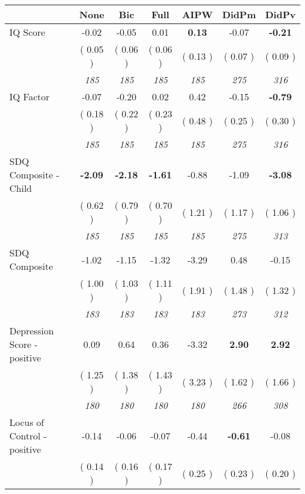 \begin{tabular}{l c c c c c c}
\toprule
 & None & Bic & Full & AIPW & DidPm & DidPv \\
\midrule
IQ Score &     -0.02 &     -0.05 &      0.01 & \textbf{     0.13} &     -0.07 & \textbf{     -0.21 } \\
& (     0.05 ) & (     0.06 ) & (     0.06 ) & (     0.13 ) & (     0.07 ) & (     0.09 ) \\
& \textit{ 185 } & \textit{ 185 } & \textit{ 185 } & \textit{ 185 } & \textit{ 275 } & \textit{ 316 } \\
IQ Factor &     -0.07 &     -0.20 &      0.02 &      0.42 &     -0.15 & \textbf{     -0.79 } \\
& (     0.18 ) & (     0.22 ) & (     0.23 ) & (     0.48 ) & (     0.25 ) & (     0.30 ) \\
& \textit{ 185 } & \textit{ 185 } & \textit{ 185 } & \textit{ 185 } & \textit{ 275 } & \textit{ 316 } \\
SDQ Composite - Child & \textbf{     -2.09 } & \textbf{     -2.18 } & \textbf{     -1.61 } &     -0.88 &     -1.09 & \textbf{     -3.08 } \\
& (     0.62 ) & (     0.79 ) & (     0.70 ) & (     1.21 ) & (     1.17 ) & (     1.06 ) \\
& \textit{ 185 } & \textit{ 185 } & \textit{ 185 } & \textit{ 185 } & \textit{ 275 } & \textit{ 313 } \\
SDQ Composite &     -1.02 &     -1.15 &     -1.32 &     -3.29 &      0.48 &     -0.15 \\
& (     1.00 ) & (     1.03 ) & (     1.11 ) & (     1.91 ) & (     1.48 ) & (     1.32 ) \\
& \textit{ 183 } & \textit{ 183 } & \textit{ 183 } & \textit{ 183 } & \textit{ 273 } & \textit{ 312 } \\
Depression Score - positive &      0.09 &      0.64 &      0.36 &     -3.32 & \textbf{      2.90 } & \textbf{      2.92 } \\
& (     1.25 ) & (     1.38 ) & (     1.43 ) & (     3.23 ) & (     1.62 ) & (     1.66 ) \\
& \textit{ 180 } & \textit{ 180 } & \textit{ 180 } & \textit{ 180 } & \textit{ 266 } & \textit{ 308 } \\
Locus of Control - positive &     -0.14 &     -0.06 &     -0.07 &     -0.44 & \textbf{     -0.61 } &     -0.08 \\
& (     0.14 ) & (     0.16 ) & (     0.17 ) & (     0.25 ) & (     0.23 ) & (     0.20 ) \\

\end{tabular}
